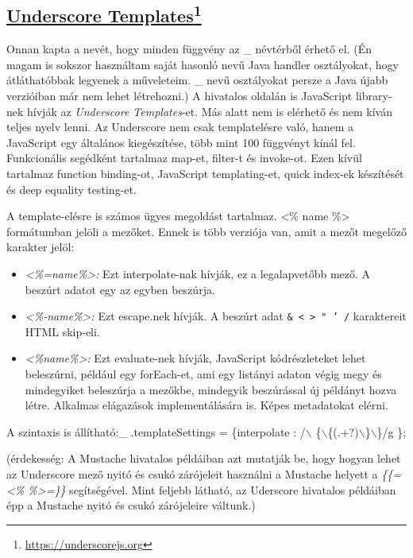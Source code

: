 \subsection[Underscore Templates]{\href{https://underscorejs.org}{Underscore Templates}\footnote{\url{https://underscorejs.org}}}
\label{sec:underscore}
Onnan kapta a nevét, hogy minden függvény az \_ névtérből érhető el.
(Én magam is sokszor használtam saját hasonló nevű Java handler osztályokat, hogy átláthatóbbak legyenek a műveleteim. 
\_ nevű osztályokat persze a Java újabb verzióiban már nem lehet létrehozni.)
A hivatalos oldalán is JavaScript library-nek hívják az \textit{Underscore Templates}-et.
Más alatt nem is elérhető és nem kíván teljes nyelv lenni.
Az Underscore nem csak templatelésre való, hanem a JavaScript egy általános kiegészítése, több mint 100 függvényt kínál fel.
Funkcionális segédként tartalmaz map-et, filter-t és invoke-ot.
Ezen kívül tartalmaz function binding-ot, JavaScript templating-et, quick index-ek készítését és deep equality testing-et.

A template-elésre is számos ügyes megoldást tartalmaz.
<\% name \%> formátumban jelöli a mezőket.
Ennek is több verziója van, amit a mezőt megelőző karakter jelöl:
\begin{itemize}
\item \emph{<\%=name\%>:}
Ezt interpolate-nak hívják, ez a legalapvetőbb mező.
A beszúrt adatot egy az egyben beszúrja.
\item \emph{<\%-name\%>:}
Ezt escape.nek hívják.
A beszúrt adat \texttt{\& < > " ' /} karaktereit HTML skip-eli.
\item \emph{<\%name\%>:}
Ezt evaluate-nek hívják, JavaScript kódrészleteket lehet beleszúrni, például egy forEach-et, ami egy listányi adaton végig megy és mindegyiket beleszúrja a mezőkbe, mindegyik beszúrással új példányt hozva létre.
Alkalmas elágazások implementálására is.
Képes metadatokat elérni.
\end{itemize}

A szintaxis is állítható:\_ .templateSettings = \{interpolate : /$\backslash$ \{$\backslash$\{(.+?)$\backslash$\}$\backslash$\}/g \};

(érdekesség: A Mustache hivatalos példáiban azt mutatják be, hogy hogyan lehet az Underscore mező nyitó és csukó zárójeleit használni a Mustache helyett a \textit{\{\{=<\% \%>=\}\}} segítségével. Mint feljebb látható, az Uderscore hivatalos példáiban épp a Mustache nyitó és csukó zárójeleire váltunk.)

